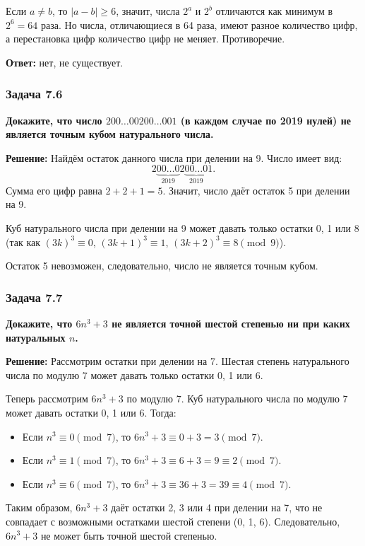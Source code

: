 \documentclass[12pt, a4paper]{article}
\begin{document}
Если $a \neq b$, то $|a - b| \ge 6$, значит, числа $2^a$ и $2^b$ отличаются как минимум в $2^6 = 64$ раза. Но числа, отличающиеся в 64 раза, имеют разное количество цифр, а перестановка цифр количество цифр не меняет. Противоречие.

\textbf{Ответ:} нет, не существует.

\subsubsection*{Задача 7.6}
\textbf{Докажите, что число $200\ldots00200\ldots001$ (в каждом случае по 2019 нулей) не является точным кубом натурального числа.}

\textbf{Решение:}
Найдём остаток данного числа при делении на 9. Число имеет вид:
\[
2 \underbrace{00\ldots0}_{2019} 2 \underbrace{00\ldots0}_{2019} 1.
\]
Сумма его цифр равна $2 + 2 + 1 = 5$. Значит, число даёт остаток 5 при делении на 9.

Куб натурального числа при делении на 9 может давать только остатки 0, 1 или 8 (так как $(3k)^3 \equiv 0$, $(3k+1)^3 \equiv 1$, $(3k+2)^3 \equiv 8 \pmod{9}$).

Остаток 5 невозможен, следовательно, число не является точным кубом.

\subsubsection*{Задача 7.7}
\textbf{Докажите, что $6n^3 + 3$ не является точной шестой степенью ни при каких натуральных $n$.}

\textbf{Решение:}
Рассмотрим остатки при делении на 7. Шестая степень натурального числа по модулю 7 может давать только остатки 0, 1 или 6.

Теперь рассмотрим $6n^3 + 3$ по модулю 7. Куб натурального числа по модулю 7 может давать остатки 0, 1 или 6. Тогда:
\begin{itemize}
    \item Если $n^3 \equiv 0 \pmod{7}$, то $6n^3 + 3 \equiv 0 + 3 = 3 \pmod{7}$.
    \item Если $n^3 \equiv 1 \pmod{7}$, то $6n^3 + 3 \equiv 6 + 3 = 9 \equiv 2 \pmod{7}$.
    \item Если $n^3 \equiv 6 \pmod{7}$, то $6n^3 + 3 \equiv 36 + 3 = 39 \equiv 4 \pmod{7}$.
\end{itemize}
Таким образом, $6n^3 + 3$ даёт остатки 2, 3 или 4 при делении на 7, что не совпадает с возможными остатками шестой степени (0, 1, 6). Следовательно, $6n^3 + 3$ не может быть точной шестой степенью.
\end{document}

